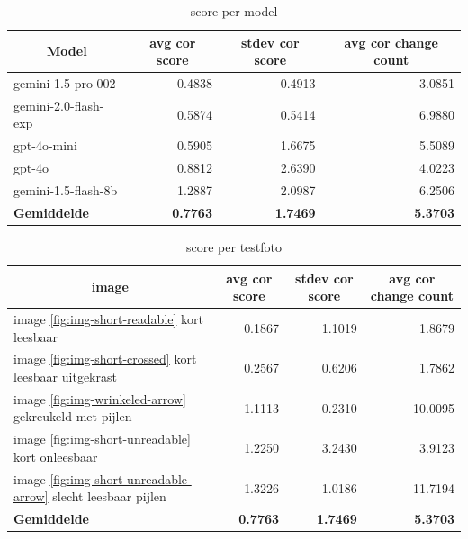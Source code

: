 \documentclass[12pt]{article}
\begin{document}
\noindent\begin{table}[H]
\caption{score per model}
\label{fig:score-model}
\begin{tabularx}{\textwidth}{X *3{r}}
    \toprule
    \multicolumn{1}{c}{\textbf{Model}} & \multicolumn{1}{c}{\textbf{avg cor score}} & \multicolumn{1}{c}{\textbf{stdev cor score}} & \multicolumn{1}{c}{\textbf{avg cor change count}} \\
    \midrule
    gemini-1.5-pro-002 & 0.4838 & 0.4913 & 3.0851 \\
    gemini-2.0-flash-exp & 0.5874 & 0.5414 & 6.9880 \\
    gpt-4o-mini & 0.5905 & 1.6675 & 5.5089 \\
    gpt-4o & 0.8812 & 2.6390 & 4.0223 \\
    gemini-1.5-flash-8b & 1.2887 & 2.0987 & 6.2506 \\
    \midrule
    \textbf{Gemiddelde} & \textbf{0.7763} & \textbf{1.7469} & \textbf{5.3703} \\
    \bottomrule
\end{tabularx}%
\end{table}



\noindent\begin{table}[H]
\caption{score per testfoto}
\label{fig:score-image}
\begin{tabularx}{\textwidth}{X *3{r}}
    \toprule
    \multicolumn{1}{c}{\textbf{image}} & \multicolumn{1}{c}{\textbf{avg cor score}} & \multicolumn{1}{c}{\textbf{stdev cor score}} & \multicolumn{1}{c}{\textbf{avg cor change count}} \\
    \midrule
    image \ref{fig:img-short-readable} kort leesbaar & 0.1867 & 1.1019 & 1.8679 \\
    image \ref{fig:img-short-crossed} kort leesbaar uitgekrast & 0.2567 & 0.6206 & 1.7862 \\
    image \ref{fig:img-wrinkeled-arrow} gekreukeld met pijlen & 1.1113 & 0.2310 & 10.0095 \\
    image \ref{fig:img-short-unreadable} kort onleesbaar & 1.2250 & 3.2430 & 3.9123 \\
    image \ref{fig:img-short-unreadable-arrow} slecht leesbaar pijlen & 1.3226 & 1.0186 & 11.7194 \\
    \midrule
    \textbf{Gemiddelde} & \textbf{0.7763} & \textbf{1.7469} & \textbf{5.3703} \\
    \bottomrule
\end{tabularx}%
\end{table}
\end{document}
